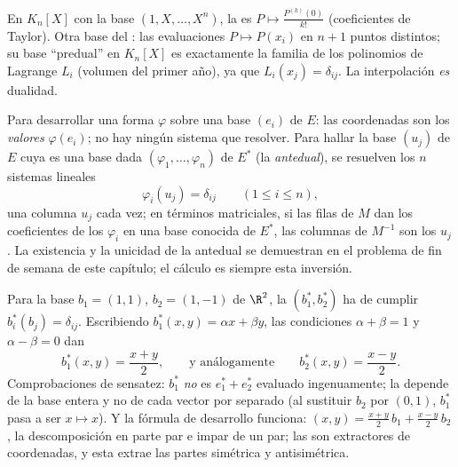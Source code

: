 \begin{example}\label{ex:b2:linalg:dualexamples}
En $K_n[X]$ con la base $(1, X, \dots, X^n)$, la  es $P
\mapsto \frac{P^{(k)}(0)}{k!}$ (coeficientes de Taylor). Otra base del
: las evaluaciones $P \mapsto P(x_i)$ en $n + 1$ puntos
distintos; su base ``predual'' en $K_n[X]$ es exactamente la familia
de los polinomios de Lagrange $L_i$ (volumen del primer año), ya que
$L_i(x_j) = \delta_{ij}$. La interpolación \emph{es} dualidad.
\end{example}

\begin{method}\label{met:b2:linalg:dualbasis}
Para desarrollar una forma $\varphi$ sobre una base $(e_i)$ de $E$:
las coordenadas son los \emph{valores} $\varphi(e_i)$; no hay ningún
sistema que resolver. Para hallar la base $(u_j)$ de $E$ cuya
 es una base dada $(\varphi_1, \dots, \varphi_n)$ de $E^*$
(la \emph{antedual}), se resuelven los $n$ sistemas lineales
\[
\varphi_i(u_j) = \delta_{ij} \qquad (1 \leq i \leq n),
\]
una columna $u_j$ cada vez; en términos matriciales, si las filas
de $M$ dan los coeficientes de los $\varphi_i$ en una base conocida
de $E^*$, las columnas de $M^{-1}$ son los $u_j$. La existencia y
la unicidad de la antedual se demuestran en el problema de fin de
semana de este capítulo; el cálculo es siempre esta inversión.
\end{method}

\begin{example}\label{ex:b2:linalg:dualbasis2d}
Para la base $b_1 = (1, 1)$, $b_2 = (1, -1)$ de $\R^2$, la
 $(b_1^*, b_2^*)$ ha de cumplir $b_i^*(b_j) =
\delta_{ij}$. Escribiendo $b_1^*(x, y) = \alpha x + \beta y$, las
condiciones $\alpha + \beta = 1$ y $\alpha - \beta = 0$ dan
\[
b_1^*(x, y) = \frac{x + y}{2},
\qquad\text{y análogamente}\qquad
b_2^*(x, y) = \frac{x - y}{2} .
\]
Comprobaciones de sensatez: $b_1^*$ \emph{no} es $e_1^* + e_2^*$
evaluado ingenuamente; la  depende de la base entera y no
de cada vector por separado (al sustituir $b_2$ por $(0, 1)$,
$b_1^*$ pasa a ser $x \mapsto x$). Y la fórmula de desarrollo
funciona: $(x, y) = \frac{x+y}2\,b_1 + \frac{x-y}2\,b_2$, la
descomposición en parte par e impar de un par; las 
son extractores de coordenadas, y esta extrae las partes simétrica
y antisimétrica.
\end{example}

